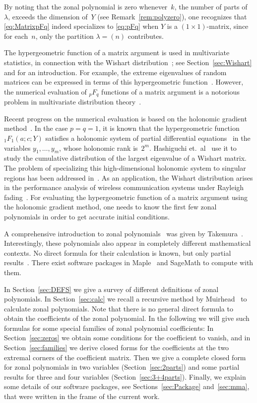 \documentclass{mathincs}
\numberwithin{equation}{section}
\numberwithin{figure}{section}
\theoremstyle{plain}
\theoremstyle{definition}
\theoremstyle{remark}
\theoremstyle{plain}
\theoremstyle{definition}
\theoremstyle{plain}
\theoremstyle{plain}
\begin{document}
By noting that the zonal polynomial is zero whenever~$k$, the number of parts
of~$\lambda$, exceeds the dimension of~$Y$ (see Remark~\ref{rem:polyzero}),
one recognizes that \eqref{eq:MatrixpFq} indeed specializes to \eqref{eq:pFq}
when $Y$ is a $(1\times1)$-matrix, since for each~$n$, only the partition
$\lambda=(n)$ contributes.

The hypergeometric function of a matrix argument is used in multivariate
statistics, in connection with the Wishart distribution~\cite{Wishart28}; see
Section~\ref{sec:Wishart} and \cite{GrossRichards87} for an introduction.  For
example, the extreme eigenvalues of random matrices can be expressed in terms
of this hypergeometric function~\cite{ButlerPaige11, Johnstone01}.  However,
the numerical evaluation of ${}_pF_q$ functions of a matrix argument is a
notorious problem in multivariate distribution theory~\cite{KoevEdelman06}.

Recent progress on the numerical evaluation is based on the holonomic
gradient method~\cite{NakayamaEtAl11}. In the case $p=q=1$, it is known that
the hypergeometric function $_1F_1(a;c;Y)$ satisfies a holonomic system of
partial differential equations~\cite{Muirhead70} in the variables
$y_1,\dots,y_m$, whose holonomic rank is~$2^m$.  Hashiguchi
et.~al~\cite{Hashiguchi} use it to study the cumulative distribution of the
largest eigenvalue of a Wishart matrix. The problem of specializing this
high-dimensional holonomic system to singular regions has been addressed
in~\cite{Noro16}.  As an application, the Wishart distribution arises in the
performance analysis of wireless communication systems under Rayleigh
fading~\cite{SiriteanuEtAl15}. For evaluating the hypergeometric
function of a matrix argument using the holonomic gradient method,
one needs to know the first few zonal polynomials in order to get
accurate initial conditions.

A comprehensive introduction to zonal polynomials~\cite[\S\,35.4]{DLMF} was
given by Takemura~\cite{Takemura}. Interestingly, these polynomials also
appear in completely different mathematical contexts. No direct formula for
their calculation is known, but only partial
results~\cite{KushnerMeisner, Muirhead}. There exist software packages in
Maple~\cite{Stembridge95} and SageMath to compute with them.

In Section~\ref{sec:DEFS} we give a survey
of different definitions of zonal polynomials. In Section~\ref{sec:calc} we
recall a recursive method by Muirhead~\cite{Muirhead} to calculate zonal
polynomials. Note that there is no general direct formula to obtain the
coefficients of the zonal polynomial.  In the following we will give such
formulas for some special families of zonal polynomial coefficients: In
Section~\ref{sec:zeros} we obtain some conditions for the
coefficient to vanish, and in Section~\ref{sec:families} we derive closed
forms for the coefficients at the two extremal corners of the coefficient
matrix. Then we give a complete closed form for zonal polynomials in two
variables (Section~\ref{sec:2parts}) and some partial results for three and
four variables (Section~\ref{sec:3+4parts}). Finally, we explain some details
of our software packages, see Sections~\ref{sec:Package} and~\ref{sec:mma},
that were written in the frame of the current work.
\end{document}

